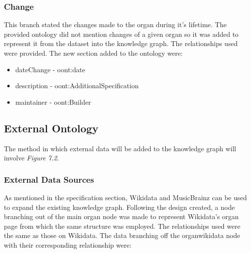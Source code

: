 \subsubsection{Change}
\hspace*{0.5cm} This branch stated the changes made to the organ during it's lifetime. The provided ontology did not mention changes of a given organ so it was added to represent it from the dataset into the knowledge graph. The relationships used were provided. The new section added to the ontology were:

\begin{itemize}
    \itemsep0em 
    \item dateChange - oont:date 
    \item description - oont:AdditionalSpecification
    \item maintainer - oont:Builder
\end{itemize}

\subsection{External Ontology}
\hspace*{0.5cm} The method in which external data will be added to the knowledge graph will involve \textit{Figure 7.2}.

\subsubsection{External Data Sources}
\hspace*{0.5cm} As mentioned in the specification section, Wikidata and MusicBrainz can be used to expand the existing knowledge graph. Following the design created, a node branching out of the main organ node was made to represent Wikidata's organ page \cite{organwikidata} from which the same structure was employed. The relationships used were the same as those on Wikidata. The data branching off the organwikidata node with their corresponding relationship were:

